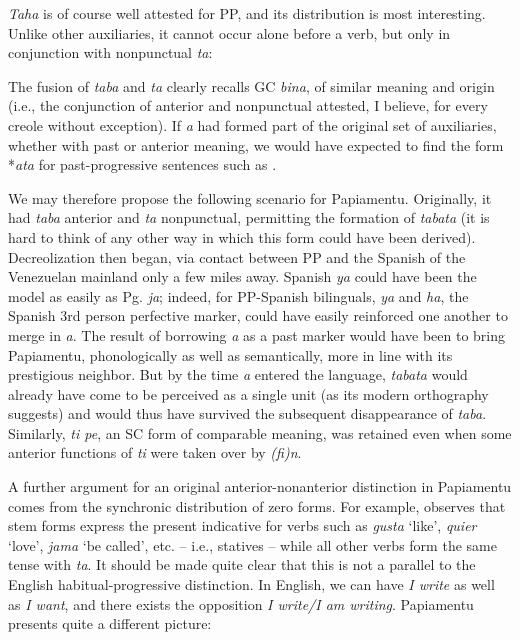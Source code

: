 \textit{Taha} is of course well attested for PP, and its distribution is most interesting. Unlike other auxiliaries, it cannot occur alone before a verb, but only in conjunction with nonpunctual \textit{ta}:

\label{ex:2:95}\z

\label{ex:2:96}\z



\label{ex:2:97}\z


\label{ex:2:98}\z

The fusion of \textit{taba} and \textit{ta} clearly recalls GC \textit{bina}, of similar meaning and origin (i.e., the conjunction of anterior and nonpunctual attested, I believe, for every creole without exception). If \textit{a} had formed part of the original set of auxiliaries, whether with past or anterior meaning, we would have expected to find the form *\textit{ata} for past-progressive sentences such as .

We may therefore propose the following scenario for Papiamentu. Originally, it had \textit{taba} anterior and \textit{ta} nonpunctual, permitting the formation of \textit{tabata} (it is hard to think of any other way in which this form could have been derived). Decreolization then began, via contact between PP and the Spanish of the Venezuelan mainland only a few miles away. Spanish \textit{ya} could have been the model as easily as Pg. \textit{ja}; indeed, for PP-Spanish bilinguals, \textit{ya} and \textit{ha}, the Spanish 3rd person perfective marker, could have easily reinforced one another to merge in \textit{a}. The result of borrowing \textit{a} as a past marker would have been to bring Papiamentu, phonologically as well as semantically, more in line with its prestigious neighbor. But by the time \textit{a} entered the language, \textit{tabata} would already have come to be perceived as a single unit (as its modern orthography suggests) and would thus have survived the subsequent disappearance of \textit{taba}. Similarly, \textit{ti pe}, an SC form of comparable meaning, was retained even when some anterior functions of \textit{ti} were taken over by \textit{(fi)n}.

A further argument for an original anterior-nonanterior distinc\-tion in Papiamentu comes from the synchronic distribution of zero forms. For example, \citet[107]{Goilo1953} observes that stem forms express the present indicative for verbs such as \textit{gusta} `like', \textit{quier} `love', \textit{jama} `be called', etc. -- i.e., statives -- while all other verbs form the same tense with \textit{ta}. It should be made quite clear that this is not a parallel to the English habitual-progressive distinction. In English, we can have \textit{I write} as well as \textit{I want}, and there exists the opposition \textit{I write/I am writing}. Papiamentu presents quite a different picture:

